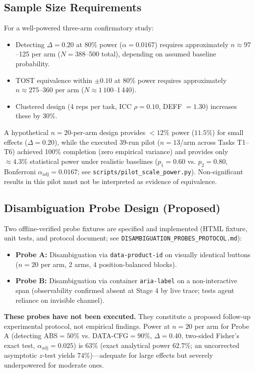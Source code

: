\documentclass[conference]{IEEEtran}
\begin{document}
\subsection{Sample Size Requirements}

For a well-powered three-arm confirmatory study:
\begin{itemize}
    \item Detecting $\Delta=0.20$ at $80\%$ power ($\alpha=0.0167$) requires approximately $n \approx 97$--125 per arm ($N = 388$--500 total), depending on assumed baseline probability.
    \item TOST equivalence within $\pm 0.10$ at $80\%$ power requires approximately $n \approx 275$--360 per arm ($N \approx 1\,100$--1\,440).
    \item Clustered design (4 reps per task, ICC $\rho=0.10$, DEFF $= 1.30$) increases these by 30\%.
\end{itemize}
A hypothetical $n=20$-per-arm design provides $< 12\%$ power ($11.5\%$) for small effects ($\Delta=0.20$), while the executed 39-run pilot ($n=13$/arm across Tasks T1--T6) achieved 100\% completion (zero empirical variance) and provides only $\approx 4.3\%$ statistical power under realistic baselines ($p_1=0.60$ vs. $p_2=0.80$, Bonferroni $\alpha_{\mathrm{adj}}=0.0167$; see \texttt{scripts/pilot\_scale\_power.py}). Non-significant results in this pilot must not be interpreted as evidence of equivalence.

\subsection{Disambiguation Probe Design (Proposed)}

Two offline-verified probe fixtures are specified and implemented (HTML fixture, unit tests, and protocol document; see \texttt{DISAMBIGUATION\_PROBES\_PROTOCOL.md}):
\begin{itemize}
    \item \textbf{Probe A:} Disambiguation via \texttt{data-product-id} on visually identical buttons ($n=20$ per arm, 2 arms, 4 position-balanced blocks).
    \item \textbf{Probe B:} Disambiguation via container \texttt{aria-label} on a non-interactive span (observability confirmed absent at Stage 4 by live trace; tests agent reliance on invisible channel).
\end{itemize}
\textbf{These probes have not been executed.} They constitute a proposed follow-up experimental protocol, not empirical findings. Power at $n=20$ per arm for Probe A (detecting ABS$=50\%$ vs. DATA-CFG$=90\%$, $\Delta=0.40$, two-sided Fisher's exact test, $\alpha_{\mathrm{adj}}=0.025$) is $63\%$ (exact analytical power $62.7\%$; an uncorrected asymptotic $z$-test yields $74\%$)---adequate for large effects but severely underpowered for moderate ones.
\end{document}
